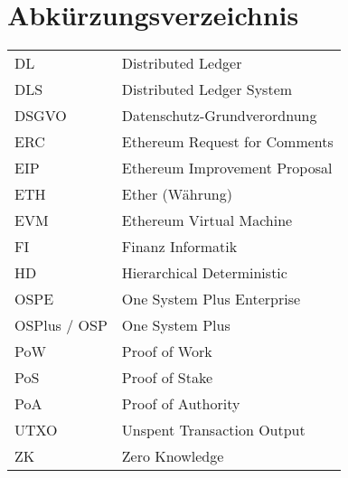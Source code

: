 
\section{Abkürzungsverzeichnis}

\begin{longtable}{p{6 cm}p{9 cm}}
    DL & Distributed Ledger \\
    DLS & Distributed Ledger System \\
    DSGVO & Datenschutz-Grundverordnung \\
    ERC & Ethereum Request for Comments \\
    EIP & Ethereum Improvement Proposal \\
    ETH & Ether (Währung) \\
    EVM & Ethereum Virtual Machine \\
    FI & Finanz Informatik \\
    HD & Hierarchical Deterministic \\
    OSPE & One System Plus Enterprise \\
    OSPlus / OSP & One System Plus \\
    PoW & Proof of Work \\
    PoS & Proof of Stake \\
    PoA & Proof of Authority \\
    UTXO & Unspent Transaction Output \\
    ZK & Zero Knowledge \\
\end{longtable}


